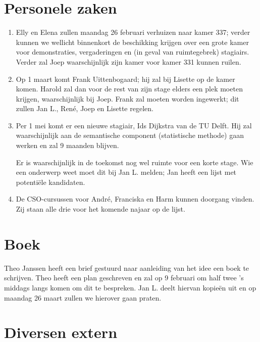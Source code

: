 \section {Personele zaken}
\begin{enumerate}
   \item Elly en Elena zullen maandag 26 februari verhuizen naar kamer 337;
         verder kunnen we wellicht binnenkort de beschikking krijgen over een 
         grote kamer voor demonstraties, vergaderingen en (in geval van
         ruimtegebrek) stagiairs. Verder zal Joep waarschijnlijk zijn kamer
         voor kamer 331 kunnen ruilen.
   \item Op 1 maart komt Frank Uittenbogaard; hij zal bij Lisette op de
         kamer komen. Harold zal dan voor de rest van zijn stage elders een 
         plek moeten krijgen, waarschijnlijk bij Joep. Frank zal moeten worden
         ingewerkt; dit zullen Jan L., Ren\'{e}, Joep en Lisette regelen.
   \item Per 1 mei komt er een nieuwe stagiair, Ids Dijkstra van de TU Delft.
         Hij zal waarschijnlijk aan de semantische component (statistische
         methode) gaan werken en zal 9 maanden blijven.

         Er is waarschijnlijk in de toekomst nog wel ruimte voor een korte
         stage. Wie een onderwerp weet moet dit bij Jan L. melden; Jan
         heeft een lijst met potenti\"{e}le kandidaten.

   \item De CSO-cursussen voor Andr\'{e}, Franciska en Harm kunnen doorgang 
         vinden. Zij staan alle drie voor het komende najaar op de lijst.
\end{enumerate}

\section {Boek}

Theo Janssen heeft een brief gestuurd naar aanleiding van het idee een boek
te schrijven. Theo heeft een plan geschreven en zal op 9 februari om half twee
's middags langs komen om dit te bespreken. Jan L. deelt hiervan kopie\"{e}n uit
en op maandag 26 maart zullen we hierover gaan praten.

\section {Diversen extern}

